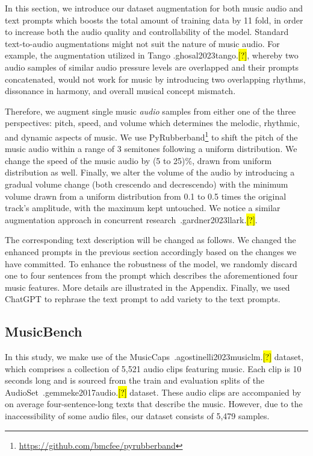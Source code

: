 \documentclass[11pt]{article}
\let\realcite\cite
\renewcommand{\cite}[1]{\ifx.#1.\hl{[?]}\else\realcite{#1}\fi}
\begin{document}
In this section, we introduce our dataset augmentation for both music audio and text prompts which boosts the total amount of training data by 11 fold, in order to increase both the audio quality and controllability of the model. Standard text-to-audio augmentations might not suit the nature of music audio. For example, the augmentation utilized in Tango \cite{ghosal2023tango}, whereby two audio samples of similar audio pressure levels are overlapped and their prompts concatenated, would not work for music by introducing two overlapping rhythms, dissonance in harmony, and overall musical concept mismatch.





Therefore, we augment single music \textit{audio} samples from either one of the three perspectives: pitch, speed, and volume which determines the melodic, rhythmic, and dynamic aspects of music. We use PyRubberband\footnote{\url{https://github.com/bmcfee/pyrubberband}} to shift the pitch of the music audio within a range of 3 semitones following a uniform distribution. We change the speed of the music audio by (5 to 25)\%, drawn from uniform distribution as well. Finally, we alter the volume of the audio by introducing a gradual volume change (both crescendo and decrescendo) with the minimum volume drawn from a uniform distribution from 0.1 to 0.5 times the original track's amplitude, with the maximum kept untouched. We notice a similar augmentation approach in concurrent research~\cite{gardner2023llark}. 

The corresponding text description will be changed as follows. We changed the enhanced prompts in the previous section accordingly based on the changes we have committed. To enhance the robustness of the model, we randomly discard one to four sentences from the prompt which describes the aforementioned four music features. More details are illustrated in the Appendix. Finally, we used ChatGPT to rephrase the text prompt to add variety to the text prompts. 


\subsection{MusicBench}
In this study, we make use of the MusicCaps~\cite{agostinelli2023musiclm} dataset, which comprises a collection of 5,521 audio clips featuring music. Each clip is 10 seconds long and is sourced from the train and evaluation splits of the AudioSet~\cite{gemmeke2017audio} dataset. These audio clips are accompanied by on average four-sentence-long texts that describe the music. However, due to the inaccessibility of some audio files, our dataset consists of 5,479 samples.
\end{document}
